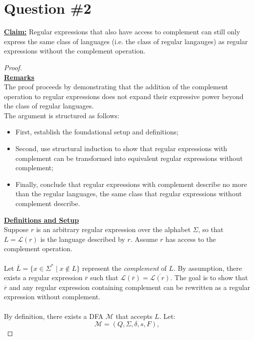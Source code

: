 \documentclass[12pt]{article}
\begin{document}
\section*{Question \#2}
\textbf{\underline{Claim:}} Regular expressions that also have access to complement can still only express the same class of languages (i.e. the class of regular langauges) as regular expressions without the complement operation.
\begin{proof}
    \leavevmode\\
        \underline{\textbf{Remarks}} \\
        The proof proceeds by demonstrating that the addition of the complement operation to regular expressions does not expand their expressive power beyond the class of regular languages. \\
        The argument is structured as follows:
        \begin{itemize}
            \item First, establish the foundational setup and definitions;
            \item Second, use structural induction to show that regular expressions with complement can be transformed into equivalent regular expressions without complement;
            \item Finally, conclude that regular expressions with complement describe no more than the regular languages, the same class that regular expressions without complement describe. 
        \end{itemize}
        \underline{\textbf{Definitions and Setup}} \\
        Suppose \( r \) is an arbitrary regular expression over the alphabet \( \Sigma \), so that \( L = \mathcal{L}(r) \) is the language described by \( r \). Assume \( r \) has access to the complement operation. \\
        \\
        Let \( \overline{L} = \{ x \in \Sigma^* \mid x \notin L \} \) represent the \textit{complement} of \( L \). By assumption, there exists a regular expression \( \overline{r} \) such that \( \mathcal{L}(\overline{r}) = \overline{\mathcal{L}(r)} \). The goal is to show that \( \overline{r} \) and any regular expression containing complement can be rewritten as a regular expression without complement. \\
        \\
        By definition, there exists a DFA \( \mathcal{M} \) that accepts \( L \). Let:
        \[
        \mathcal{M} = (Q, \Sigma, \delta, s, F),
\]
\end{proof}
\end{document}
